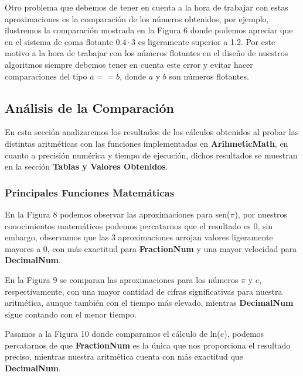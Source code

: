 \documentclass[a4paper,10pt,twocolumn]{article}
\begin{document}
	Otro problema que debemos de tener en cuenta a la hora de trabajar con estas aproximaciones es la comparación de los números obtenidos, por ejemplo, ilustremos la comparación mostrada en la Figura 6 donde podemos apreciar que en el sistema de coma flotante $0.4\cdot 3$ es ligeramente superior a 1.2. Por este motivo a la hora de trabajar con los números flotantes en el diseño de nuestros algoritmos siempre debemos tener en cuenta este error y evitar hacer comparaciones del tipo $a==b$, donde $a$ y $b$ son números flotantes.


\subsection{Análisis de la Comparación}\label{sub:comp}

	En esta sección analizaremos los resultados de los cálculos obtenidos al probar las distintas aritméticas con las funciones implementadas en \textbf{ArihmeticMath}, en cuanto a precisión numérica y tiempo de ejecución, dichos resultados se muestran en la sección \textbf{Tablas y Valores Obtenidos}.
	
\subsubsection{Principales Funciones Matemáticas}\label{sub:math_func}

	
	En la Figura 8 podemos observar las aproximaciones para sen($\pi$), por nuestros conocimientos matemáticos podemos percatarnos que el resultado es 0, sin embargo, observamos que las 3 aproximaciones arrojan valores ligeramente mayores a 0, con más exactitud para \textbf{FractionNum} y una mayor velocidad para \textbf{DecimalNum}.

	En la Figura 9 se comparan las aproximaciones para los números $\pi$ y $e$, respectivamente, con una mayor cantidad de cifras significativas para nuestra aritmética, aunque también con el tiempo más elevado, mientras \textbf{DecimalNum} sigue contando con el menor tiempo. 
	
	Pasamos a la Figura 10 donde comparamos el cálculo de ln($e$), podemos percatarnos de que \textbf{FractionNum} es la única que nos proporciona el resultado preciso, mientras nuestra aritmética cuenta con más exactitud que \textbf{DecimalNum}.
	
\end{document}
